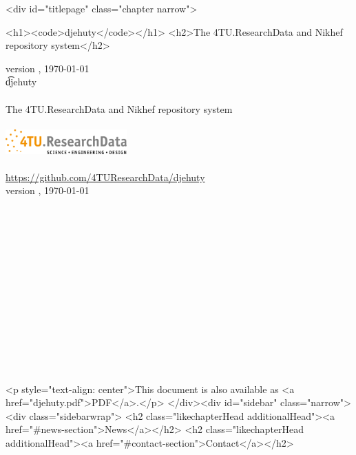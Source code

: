 \documentclass[12pt,a4paper]{book}
\begin{document}
{{{{{{\ifdefined\HCode
\begin{html}
<div id="titlepage" class="chapter narrow">
\end{html}
\fi
\begin{titlepage}
  \begin{center}
    \ifdefined\HCode
      \begin{html}
        <h1><code>djehuty</code></h1>
        <h2>The 4TU.ResearchData and Nikhef repository system</h2>
      \end{html}
      version \djehutyversion{}, \today{}~\\
    \else
      \vspace*{\fill}
      { \Huge \t{djehuty} }~\\~\\
      { \Large The 4TU.ResearchData and Nikhef repository system }~\\~\\
      \includegraphics[alt={The logo of 4TU.ResearchData},width=0.35\textwidth]{figures/logo.pdf}
      ~\\~\\
      \url{https://github.com/4TUResearchData/djehuty}~\\
       version \djehutyversion{}, \today{}
       ~\\~\\~\\~\\~\\~\\~\\~\\~\\~\\~\\~\\~\\~\\
       \vspace*{\fill}
    \fi
  \end{center}
  \thispagestyle{empty}
\end{titlepage}

\setcounter{page}{1}
\hypersetup{linkcolor=black}

\ifdefined\HCode
\begin{html}
<p style="text-align: center">This document is also available as <a href="djehuty.pdf">PDF</a>.</p>
</div><div id="sidebar" class="narrow"><div class="sidebarwrap">
<h2 class="likechapterHead additionalHead"><a href="#news-section">News</a></h2>
<h2 class="likechapterHead additionalHead"><a href="#contact-section">Contact</a></h2>
\end{html}
\renewcommand{\contentsname}{\href{\#titlepage}{Documentation}}
\fi

}}}}}}
\end{document}
